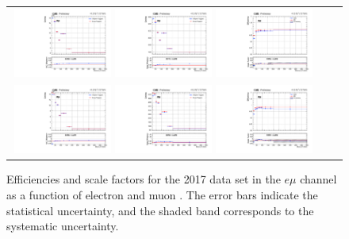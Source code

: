 \begin{figure}[h]
  \begin{center}
    \begin{tabular}{ccc}
      \includegraphics[width=0.32\textwidth]{fig_2017_TrigSF/g_lepApt_emu_MC.pdf}
      \includegraphics[width=0.32\textwidth]{fig_2017_TrigSF/g_lepApt_emu_data.pdf}
      \includegraphics[width=0.32\textwidth]{fig_2017_TrigSF/g_emu_lepApt_FullSystUncBand.pdf}\\
      \includegraphics[width=0.32\textwidth]{fig_2017_TrigSF/g_lepBpt_emu_MC.pdf}
      \includegraphics[width=0.32\textwidth]{fig_2017_TrigSF/g_lepBpt_emu_data.pdf}
      \includegraphics[width=0.32\textwidth]{fig_2017_TrigSF/g_emu_lepBpt_FullSystUncBand.pdf}\\
    \end{tabular}
    \caption{Efficiencies and scale factors for the 2017 data set in the $e\mu$ channel as a function of electron and muon \pT.
            The error bars indicate the statistical uncertainty, and the shaded band corresponds to the systematic uncertainty.
            }
    \label{TrigSF_2017_1}
  \end{center}
\end{figure}

